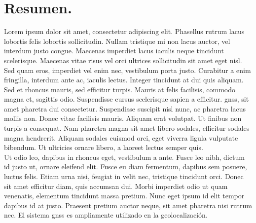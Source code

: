 \chapter*{Resumen.}

\begin{justify}

    Lorem ipsum dolor sit amet, consectetur adipiscing elit.
    Phasellus rutrum lacus lobortis felis lobortis sollicitudin. Nullam tristique mi non lacus auctor, vel interdum justo congue.
    Maecenas imperdiet lacus iaculis neque tincidunt scelerisque. Maecenas vitae risus vel orci ultrices sollicitudin sit amet eget nisl.
    Sed quam eros, imperdiet vel enim nec, vestibulum porta justo. Curabitur a enim fringilla, interdum ante ac, iaculis lectus.
    Integer tincidunt at dui quis aliquam.\\

    \noindent Sed et rhoncus mauris, sed efficitur turpis.
    Mauris at felis facilisis, commodo magna et, sagittis odio. Suspendisse cursus scelerisque sapien a efficitur.
    \gls{gnss}, sit amet pharetra dui consectetur.
    Suspendisse suscipit nisl nunc, ac pharetra lacus mollis non. Donec vitae facilisis mauris.
    Aliquam erat volutpat. Ut finibus non turpis a consequat. Nam pharetra magna sit amet libero sodales, efficitur sodales magna hendrerit.
    Aliquam sodales euismod orci, eget viverra ligula vulputate bibendum. Ut ultricies ornare libero, a laoreet lectus semper quis.\\
    
    \noindent Ut odio leo, dapibus in rhoncus eget, vestibulum a ante.
    Fusce leo nibh, dictum id justo ut, ornare eleifend elit. Fusce eu diam fermentum, dapibus sem posuere, luctus felis.
    Etiam urna nisi, feugiat in velit nec, tristique tincidunt orci. Donec sit amet efficitur diam, quis accumsan dui.
    Morbi imperdiet odio ut quam venenatis, elementum tincidunt massa pretium. Nunc eget ipsum id elit tempor dapibus id at justo.
    Praesent pretium auctor neque, sit amet pharetra nisi rutrum nec. El sistema \gls{gnss} es ampliamente utilizado en la geolocalización.

\end{justify}